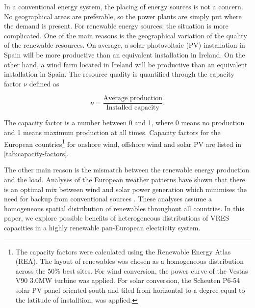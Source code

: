 \documentclass[a4paper, 12pt, sort&compress]{elsarticle}%
\begin{document}
In a conventional energy system, the placing of energy sources is not
a concern. No geographical areas are preferable, so the power plants
are simply put where the demand is present. For renewable energy
sources, the situation is more complicated. One of the main reasons is
the geographical variation of the quality of the renewable
resources. On average, a solar photovoltaic (PV) installation in
Spain will be more productive than an equivalent installation in
Ireland. On the other hand, a wind farm located in Ireland will be
productive than an equivalent installation in Spain. The resource
quality is quantified through the capacity factor $\nu$ defined as

\begin{equation}
  \label{eq:1}
  \nu = \frac{\mbox{Average production}}{\mbox{Installed capacity}} .
\end{equation}

The capacity factor is a number between 0 and 1, where 0 means no
production and 1 means maximum production at all times. Capacity
factors for the European countries\footnote{The capacity factors were
  calculated using the Renewable Energy Atlas\cite{REA} (REA). The layout of
  renewables was chosen as a homogeneous distribution across the 50\%
  best sites. For wind conversion, the power curve of the Vestas V90
  3.0MW turbine was applied. For solar conversion, the Scheuten P6-54
  solar PV panel oriented south and tiled from horizontal to a degree
  equal to the latitude of installtion, was applied.} for onshore wind, offshore wind and solar PV are listed in
\cref{tab:capacity-factors}.




The other main reason is the mismatch between the renewable energy
production and the load. Analyses of the European weather patterns
have shown that there is an optimal mix between wind and solar power
generation which minimises the need for backup from conventional
sources \cite{Heide2010,Heide2011}. These analyses assume a
homogeneous spatial distribution of renewables throughout all
countries. In this paper, we explore possible benefits of
heterogeneous distributions of VRES capacities in a highly renewable
pan-European electricity system.
\end{document}
